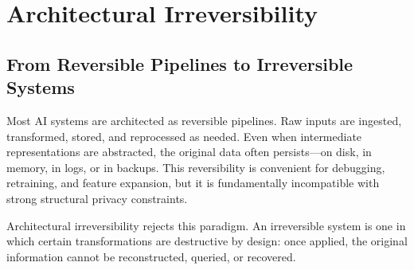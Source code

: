 \documentclass[conference]{IEEEtran}
\begin{document}
\section{Architectural Irreversibility}

\subsection{From Reversible Pipelines to Irreversible Systems}
Most AI systems are architected as reversible pipelines. Raw inputs are ingested, transformed, stored, and reprocessed as needed. Even when intermediate representations are abstracted, the original data often persists---on disk, in memory, in logs, or in backups. This reversibility is convenient for debugging, retraining, and feature expansion, but it is fundamentally incompatible with strong structural privacy constraints.

Architectural irreversibility rejects this paradigm. An irreversible system is one in which certain transformations are destructive by design: once applied, the original information cannot be reconstructed, queried, or recovered.
\end{document}
